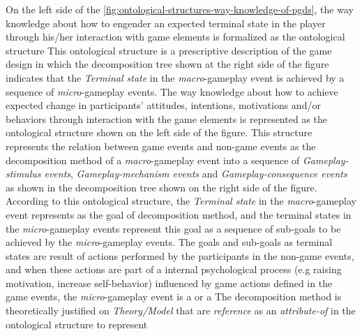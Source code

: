 On the left side of the \autoref{fig:ontological-structures-way-knowledge-of-pgds}, the way knowledge about how to engender an expected terminal state in the player through his/her interaction with game elements is formalized as the ontological structure  This ontological structure is a prescriptive description of the game design in which the decomposition tree shown at the right side of the figure indicates that the \emph{Terminal state} in the \emph{macro}-gameplay event is achieved by a sequence of \emph{micro}-gameplay events. The way knowledge about how to achieve expected change in participants' attitudes, intentions, motivations and/or behaviors through interaction with the game elements is represented as the ontological structure  shown on the left side of the figure. This structure represents the relation between game events and non-game events as the decomposition method of a \emph{macro}-gameplay event into a sequence of \emph{Gameplay-stimulus events}, \emph{Gameplay-mechanism events} and \emph{Gameplay-consequence events} as shown in the decomposition tree shown on the right side of the figure. According to this ontological structure, the \emph{Terminal state} in the \emph{macro}-gameplay event represents  as the goal of decomposition method, and the terminal states in the \emph{micro}-gameplay events represent  this goal as a sequence of sub-goals to be achieved by the \emph{micro}-gameplay events. The goals and sub-goals as terminal states are result of actions performed by the participants in the non-game events, and when these actions are part of a internal psychological process (e.g raising motivation, increase self-behavior) influenced by game actions defined in the game events, the \emph{micro}-gameplay event is a  or a  The decomposition method is theoretically justified on \emph{Theory/Model} that are \emph{reference} as an \emph{attribute-of} in the ontological structure to represent 

